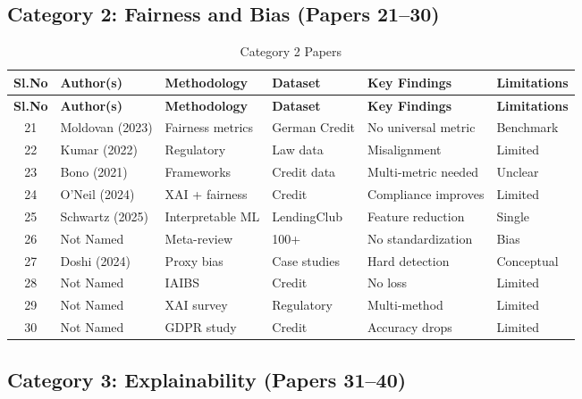 \subsection{Category 2: Fairness and Bias (Papers 21--30)}

\begin{longtable}{c p{} p{} p{} p{} p{}}
\caption{Category 2 Papers} \\
\toprule
\textbf{Sl.No} & \textbf{Author(s)} & \textbf{Methodology} & \textbf{Dataset} & \textbf{Key Findings} & \textbf{Limitations} \\
\midrule
\endfirsthead
\toprule
\textbf{Sl.No} & \textbf{Author(s)} & \textbf{Methodology} & \textbf{Dataset} & \textbf{Key Findings} & \textbf{Limitations} \\
\midrule
\endhead

21 & Moldovan (2023) & Fairness metrics & German Credit & No universal metric & Benchmark \\
22 & Kumar (2022) & Regulatory & Law data & Misalignment & Limited \\
23 & Bono (2021) & Frameworks & Credit data & Multi-metric needed & Unclear \\
24 & O'Neil (2024) & XAI + fairness & Credit & Compliance improves & Limited \\
25 & Schwartz (2025) & Interpretable ML & LendingClub & Feature reduction & Single \\
26 & Not Named & Meta-review & 100+ & No standardization & Bias \\
27 & Doshi (2024) & Proxy bias & Case studies & Hard detection & Conceptual \\
28 & Not Named & IAIBS & Credit & No loss & Limited \\
29 & Not Named & XAI survey & Regulatory & Multi-method & Limited \\
30 & Not Named & GDPR study & Credit & Accuracy drops & Limited \\
\bottomrule
\end{longtable}

\subsection{Category 3: Explainability (Papers 31--40)}


